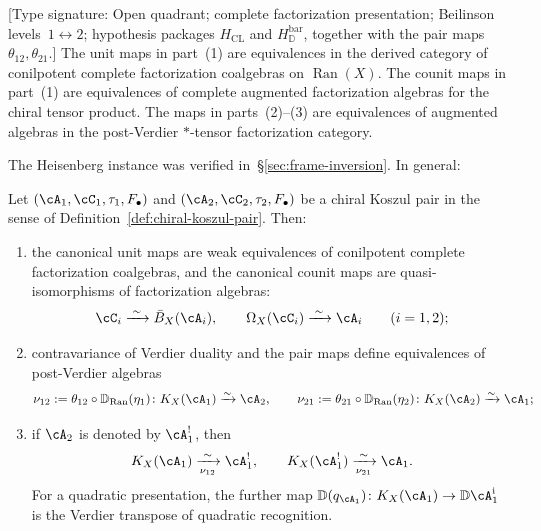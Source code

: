 \begin{theorem}
\label{thm:bar-cobar-isomorphism-main}
\textup{[Type signature: Open quadrant; complete factorization
presentation; Beilinson levels~$1\leftrightarrow2$; hypothesis packages
$H_{\mathrm{CL}}$ and $H_{\mathbb D}^{\mathrm{bar}}$, together with the
pair maps~$\theta_{12},\theta_{21}$.]}
The unit maps in part~\textup{(1)} are equivalences in the derived
category of conilpotent complete factorization coalgebras on
$\operatorname{Ran}(X)$. The counit maps in part~\textup{(1)} are
equivalences of complete augmented factorization algebras for the
chiral tensor product.  The maps in parts~\textup{(2)}--\textup{(3)}
are equivalences of augmented algebras in the post-Verdier $*$-tensor
factorization category.

\smallskip\noindent
The Heisenberg instance was verified in~\S\ref{sec:frame-inversion}.
In general:

Let $(\cA_1, \cC_1, \tau_1, F_\bullet)$ and
$(\cA_2, \cC_2, \tau_2, F_\bullet)$ be a chiral Koszul pair in
the sense of Definition~\textup{\ref{def:chiral-koszul-pair}}.
Then:
\begin{enumerate}
\item the canonical unit maps are weak equivalences of conilpotent
 complete factorization coalgebras, and the canonical counit maps are
 quasi-isomorphisms of factorization algebras:
\[
\cC_i \xrightarrow{\;\sim\;} \bar{B}_X(\cA_i), \qquad
\Omega_X(\cC_i) \xrightarrow{\;\sim\;} \cA_i
\qquad (i = 1, 2);
\]

\item contravariance of Verdier duality and the pair maps define
 equivalences of post-Verdier algebras
\[
\nu_{12}:=
\theta_{12}\circ\mathbb D_{\operatorname{Ran}}(\eta_1)\colon
K_X(\cA_1)\xrightarrow{\sim}\cA_2,
\qquad
\nu_{21}:=
\theta_{21}\circ\mathbb D_{\operatorname{Ran}}(\eta_2)\colon
K_X(\cA_2)\xrightarrow{\sim}\cA_1;
\]

\item if $\cA_2$ is denoted by $\cA_1^!$, then
\[
K_X(\cA_1)\xrightarrow[\nu_{12}]{\sim}\cA_1^!,
\qquad
K_X(\cA_1^!)\xrightarrow[\nu_{21}]{\sim}\cA_1.
\]
 For a quadratic presentation, the further map
 $\mathbb D(q_{\cA_1})\colon K_X(\cA_1)\to
 \mathbb D\cA_1^{\mathrm i}$ is the Verdier transpose of quadratic
 recognition.
\end{enumerate}
\end{theorem}

